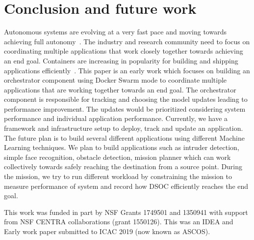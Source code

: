 \section{Conclusion and future work}

Autonomous systems are evolving at a very fast pace and moving towards achieving full autonomy~\cite{transportresearch}. The industry and research community need to focus on coordinating multiple applications that work closely together towards achieving an end goal. Containers are increasing in popularity for building and shipping applications efficiently~\cite{docker_article}. This paper is an early work which focuses on building an orchestrator component using Docker Swarm mode to coordinate multiple applications that are working together towards an end goal. The orchestrator component is responsible for tracking and choosing the model updates leading to performance improvement. The updates would be prioritized considering system performance and individual application performance. Currently, we have a framework and infrastructure setup to deploy, track and update an application. The future plan is to build several different applications using different Machine Learning techniques. We plan to build applications such as intruder detection, simple face recognition, obstacle detection, mission planner which can work collectively towards safely reaching the destination from a source point. During the mission, we try to run different workload by constraining the mission to measure performance of system and record how DSOC efficiently reaches the end goal.

{\small {} This work was funded in part by NSF Grants 1749501 and 1350941 with support from NSF CENTRA collaborations (grant 1550126). This was an IDEA and Early work paper submitted to ICAC 2019 (now known as ASCOS).}